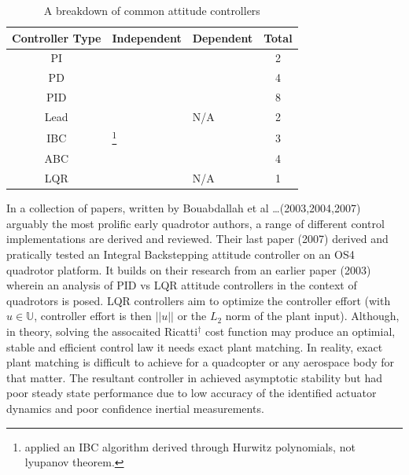 \begin{table}[h]
\centering
\begin{tabular}{ |c|l|l|c| }
\hline
Controller Type & Independent & Dependent & Total\\ \hline
PI & \cite{attitudecontrolproblem} & \cite{attitudecontrolproblem} & 2\\ \hline
PD & \cite{modelingquadcopter, tiltrihani} & \cite{fullquaternion,singleaxistilting} & 4\\ \hline
PID & \cite{optimizedpidquadcopter, attitudecontrolproblem, quaddynamics, tiltpropellercontrol, pidlqr} & \cite{attitudecontrolproblem, starmac, adaptivedisturbancecontrol} & 8\\ \hline
Lead & \cite{x4flyer, dynamicmodelling2009} & N/A & 2\\ \hline
IBC & \cite{tpheonix, backsteppingquadcoptercontrol}\footnote{\cite{tpheonix} applied an IBC algorithm derived through Hurwitz polynomials, not lyupanov theorem.} & \cite{backsteppingquadcoptercontrol} & 3\\ \hline
ABC & \multicolumn{2}{l|}{\cite{adaptivebackstep, nonlinearadaptive, 6dofbackstep, intelligentbackstep}} & 4\\ \hline
LQR & \cite{pidlqr} & N/A & 1\\ \hline
\end{tabular}
\caption{A breakdown of common attitude controllers}
\label{tab:controllers}
\end{table}
\par
In a collection of papers, written by Bouabdallah et al \ldots (2003,2004,2007) arguably the most prolific early quadrotor authors, a range of different control implementations are derived and reviewed. Their last paper (2007)\cite{fullquadcoptercontrol} derived and pratically tested an Integral Backstepping attitude controller on an OS4 quadrotor platform. It builds on their research from an earlier paper (2003)\cite{pidlqr} wherein an analysis of PID vs LQR attitude controllers in the context of quadrotors is posed. LQR controllers aim to optimize the controller effort (with $u\in\mathbb{U}$, controller effort is then $||u||$ or the $L_2$ norm of the plant input). Although, in theory, solving the assocaited Ricatti$^{\dagger}$ cost function may produce an optimial, stable and efficient control law it needs exact plant matching. In reality, exact plant matching is difficult to achieve for a quadcopter or any aerospace body for that matter. The resultant controller in \cite{pidlqr} achieved asymptotic stability but had poor steady state performance due to low accuracy of the identified actuator dynamics and poor confidence inertial measurements.
